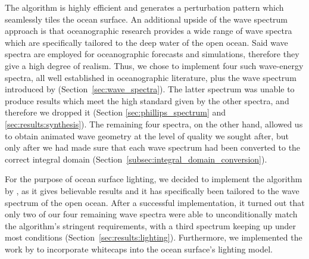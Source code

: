 The \FFT algorithm is highly efficient and generates a perturbation
pattern which seamlessly tiles the ocean surface.
An additional upside of the wave spectrum approach is that oceanographic
research provides a wide range of wave spectra which are specifically
tailored to the deep water of the open ocean. Said wave spectra are
employed for oceanographic forecasts and simulations, therefore they
give a high degree of realism.
Thus, we chose to implement four such wave-energy spectra,
all well established in oceanographic literature, plus the wave
spectrum introduced by \citeauthor{course:simulatingocean} (Section~\ref{sec:wave_spectra}).
The latter spectrum was unable to produce results which meet the high
standard given by the other spectra, and therefore we dropped it
(Section \ref{sec:phillips_spectrum} and \ref{sec:results:synthesis}).
The remaining four spectra, on the other hand, allowed us to obtain
animated wave geometry at the level of quality we sought after,
but only after we had made sure that each wave spectrum had been converted
to the correct integral domain (Section~\ref{subsec:integral_domain_conversion}).
%

For the purpose of ocean surface lighting, we decided to implement the
algorithm by \citet{misc:oceanlightingfft}, as it gives believable results
and it has specifically been tailored to the wave spectrum of the open ocean.
After a successful implementation, it turned out that only two of our
four remaining wave spectra were able to unconditionally match the algorithm's
stringent requirements, with a third spectrum keeping up under most
conditions (Section~\ref{sec:results:lighting}).
Furthermore, we implemented the work by \citet{article:whitecaps} to
incorporate whitecaps into the ocean surface's lighting model.

